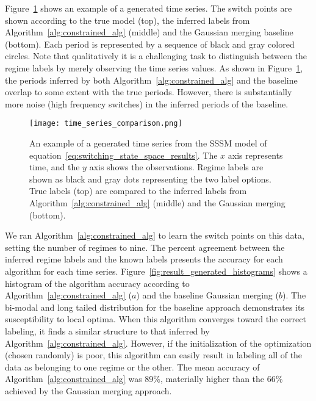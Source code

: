 Figure~\ref{fig:result_generated_time_series_with_labels} shows an example of a generated time series. The switch points are shown according to the true model (top), the inferred labels from Algorithm~\ref{alg:constrained_alg} (middle) and the Gaussian merging baseline (bottom). Each period is represented by a sequence of black and gray colored circles. Note that qualitatively it is a challenging task to distinguish between the regime labels by merely observing the time series values. As shown in Figure~\ref{fig:result_generated_time_series_with_labels}, the periods inferred by both Algorithm~\ref{alg:constrained_alg} and the baseline overlap to some extent with the true periods. However, there is substantially more noise (high frequency switches) in the inferred periods of the baseline.

\begin{figure}
\centering
\texttt{[image: time\_series\_comparison.png]}
\caption{An example of a generated time series from the SSSM model of equation~\ref{eq:switching_state_space_results}. The $x$ axis represents time, and the $y$ axis shows the observations. Regime labels are shown as black and gray dots representing the two label options. True labels (top) are compared to the inferred labels from Algorithm~\ref{alg:constrained_alg} (middle) and the Gaussian merging (bottom).}
\label{fig:result_generated_time_series_with_labels}
\end{figure}

We ran Algorithm~\ref{alg:constrained_alg} to learn the switch points on this data, setting the number of regimes to nine. The percent agreement between the inferred regime labels and the known labels presents the accuracy for each algorithm for each time series. Figure~\ref{fig:result_generated_histograms} shows a histogram of the algorithm accuracy according to Algorithm~\ref{alg:constrained_alg} ($a$) and the baseline Gaussian merging ($b$). The bi-modal and long tailed distribution for the baseline approach demonstrates its susceptibility to local optima. When this algorithm converges toward the correct labeling, it finds a similar structure to that inferred by Algorithm~\ref{alg:constrained_alg}. However, if the initialization of the optimization (chosen randomly) is poor, this algorithm can easily result in labeling all of the data as belonging to one regime or the other. The mean accuracy of Algorithm~\ref{alg:constrained_alg} was 89\%, materially higher than the 66\% achieved by the Gaussian merging approach.

